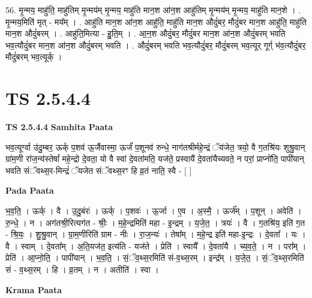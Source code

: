 \documentclass[17pt]{extarticle}
\begin{document}
56. मृ॒न्मय॒ माहु॑ति॒ माहु॑तिम् मृ॒न्मय॑म् मृ॒न्मय॒ माहु॑ति मान॒श आ॑न॒श आहु॑तिम् मृ॒न्मय॑म् मृ॒न्मय॒ माहु॑ति मान॒शे । . मृ॒न्मय॒मिति॑ मृत् - मय᳚म् । . आहु॑ति मान॒श आ॑न॒श आहु॑ति॒ माहु॑ति मान॒श औदुं॑बर॒ मौदुं॑बर मान॒श आहु॑ति॒ माहु॑ति मान॒श औदुं॑बरम् । . आहु॑ति॒मित्या - हु॒ति॒म् । . आ॒न॒श औदुं॑बर॒ मौदुं॑बर मान॒श आ॑न॒श औदुं॑बरम् भवति भव॒त्यौदुं॑बर मान॒श आ॑न॒श औदुं॑बरम् भवति । . औदुं॑बरम् भवति भव॒त्यौदुं॑बर॒ मौदुं॑बरम् भव॒त्यूर् गूर्ग् भ॑व॒त्यौदुं॑बर॒ मौदुं॑बरम् भव॒त्यूर्क् । \newline
\pagebreak
{}

\section{ TS 2.5.4.4 }

\textbf{TS 2.5.4.4 } \newline
\textbf{Samhita Paata} \newline

भव॒त्यूर्ग्वा उ॑दु॒म्बर॒ ऊर्क् प॒शव॑ ऊ॒र्जैवास्मा॒ ऊर्जं॑ प॒शूनव॑ रुन्धे॒ नाग॑तश्रीर्महे॒न्द्रं ॅय॑जेत॒ त्रयो॒ वै ग॒तश्रि॑यः शुश्रु॒वान् ग्रा॑म॒णी रा॑ज॒न्य॑स्तेषां᳚ महे॒न्द्रो दे॒वता॒ यो वै स्वां दे॒वता॑मति॒ यज॑ते॒ प्रस्वायै॑ दे॒वता॑यैच्यवते॒ न परां॒ प्राप्नो॑ति॒ पापी॑यान् भवति संॅवथ्स॒र-मिन्द्रं॑ ॅयजेत संॅवथ्स॒रꣳ हि व्र॒तं नाति॒ स्वै - [  ] \newline

\textbf{Pada Paata} \newline

भ॒व॒ति॒ । ऊर्क् । वै । उ॒दु॒बंरः॑ । ऊर्क् । प॒शवः॑ । ऊ॒र्जा । ए॒व । अ॒स्मै॒ । ऊर्ज᳚म् । प॒शून् । अवेति॑ । रु॒न्धे॒ । न । अग॑तश्री॒रित्यग॑त - श्रीः॒ । म॒हे॒न्द्रमिति॑ महा - इ॒न्द्रम् । य॒जे॒त॒ । त्रयः॑ । वै । ग॒तश्रि॑य॒ इति॑ ग॒त - श्रि॒यः॒ । शु॒श्रु॒वान् । ग्रा॒म॒णीरिति॑ ग्राम - नीः । रा॒ज॒न्यः॑ । तेषा᳚म् । म॒हे॒न्द्र इति॑ महा-इ॒न्द्रः । दे॒वता᳚ । यः । वै । स्वाम् । दे॒वता᳚म् । अ॒ति॒यज॑त॒ इत्य॑ति - यज॑ते । प्रेति॑ । स्वायै᳚ । दे॒वता॑यै । च्य॒व॒ते॒ । न । परा᳚म् । प्रेति॑ । आ॒प्नो॒ति॒ । पापी॑यान् । भ॒व॒ति॒ । सं॒ॅव॒थ्स॒रमिति॑ सं-व॒थ्स॒रम् । इन्द्र᳚म् । य॒जे॒त॒ । सं॒ॅव॒थ्स॒रमिति॑ सं - व॒थ्स॒रम् । हि । व्र॒तम् । न । अतीति॑ । स्वा ।  \newline


\textbf{Krama Paata} \newline
\end{document}
